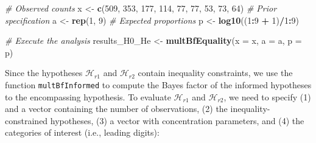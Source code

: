 \documentclass[
  english,
  man,floatsintext]{apa6}
\newenvironment{Shaded}{\begin{snugshade}}{\end{snugshade}}
\newcommand{\CommentTok}[1]{\textcolor[rgb]{0.56,0.35,0.01}{\textit{#1}}}
\newcommand{\DataTypeTok}[1]{\textcolor[rgb]{0.13,0.29,0.53}{#1}}
\newcommand{\DecValTok}[1]{\textcolor[rgb]{0.00,0.00,0.81}{#1}}
\newcommand{\KeywordTok}[1]{\textcolor[rgb]{0.13,0.29,0.53}{\textbf{#1}}}
\newcommand{\NormalTok}[1]{#1}
\newcommand{\OperatorTok}[1]{\textcolor[rgb]{0.81,0.36,0.00}{\textbf{#1}}}
\newcommand{\StringTok}[1]{\textcolor[rgb]{0.31,0.60,0.02}{#1}}
\begin{document}
\begin{Shaded}
\begin{Highlighting}[]
\CommentTok{\# Observed counts}
\NormalTok{x \textless{}{-}}\StringTok{ }\KeywordTok{c}\NormalTok{(}\DecValTok{509}\NormalTok{, }\DecValTok{353}\NormalTok{, }\DecValTok{177}\NormalTok{, }\DecValTok{114}\NormalTok{,  }\DecValTok{77}\NormalTok{,  }\DecValTok{77}\NormalTok{,  }\DecValTok{53}\NormalTok{,  }\DecValTok{73}\NormalTok{,  }\DecValTok{64}\NormalTok{)}
\CommentTok{\# Prior specification}
\NormalTok{a \textless{}{-}}\StringTok{  }\KeywordTok{rep}\NormalTok{(}\DecValTok{1}\NormalTok{, }\DecValTok{9}\NormalTok{)}
\CommentTok{\# Expected proportions}
\NormalTok{p \textless{}{-}}\StringTok{ }\KeywordTok{log10}\NormalTok{((}\DecValTok{1}\OperatorTok{:}\DecValTok{9} \OperatorTok{+}\StringTok{ }\DecValTok{1}\NormalTok{)}\OperatorTok{/}\DecValTok{1}\OperatorTok{:}\DecValTok{9}\NormalTok{)}

\CommentTok{\# Execute the analysis}
\NormalTok{results\_H0\_He  \textless{}{-}}\StringTok{ }\KeywordTok{multBfEquality}\NormalTok{(}\DataTypeTok{x =}\NormalTok{ x, }\DataTypeTok{a =}\NormalTok{ a, }\DataTypeTok{p =}\NormalTok{ p)}
\end{Highlighting}
\end{Shaded}

Since the hypotheses \(\mathcal{H}_{r1}\) and \(\mathcal{H}_{r2}\) contain inequality constraints, we use the function \texttt{multBfInformed} to compute the Bayes factor of the informed hypotheses to the encompassing hypothesis. To evaluate \(\mathcal{H}_{r1}\) and \(\mathcal{H}_{r2}\), we need to specify
(1) and a vector containing the number of observations, (2) the inequality-constrained hypotheses,
(3) a vector with concentration parameters, and (4) the categories of interest
(i.e., leading digits):
\end{document}
